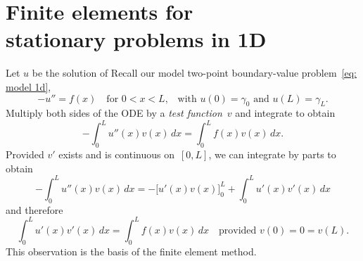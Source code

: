 \chapter[Finite elements in 1D]{Finite elements for \\
stationary problems in 1D}\label{chap: FEM 1d}

Let $u$ be the solution of 
Recall our model two-point boundary-value problem~\ref{eq: model 1d}, 
\begin{equation}\label{eq: model 1d chap 2}
-u''=f(x)\quad\text{for $0<x<L$,}
	\quad\text{with $u(0)=\gamma_0$ and $u(L)=\gamma_L$.}
\end{equation}
Multiply both sides of the ODE by a \emph{test function}~$v$ and integrate to 
obtain
\[
-\int_0^L u''(x)v(x)\,dx=\int_0^L f(x)v(x)\,dx.
\]
Provided $v'$ exists and is continuous on~$[0,L]$, we can integrate by parts to 
obtain
\begin{equation}\label{eq: int by parts}
-\int_0^L u''(x)v(x)\,dx=-\bigl[u'(x)v(x)\bigr]_0^L+\int_0^Lu'(x)v'(x)\,dx
\end{equation}
and therefore
\begin{equation}\label{eq: model 1d weak}
\int_0^L u'(x)v'(x)\,dx=\int_0^L f(x)v(x)\,dx
	\quad\text{provided $v(0)=0=v(L)$.}
\end{equation}
This observation is the basis of the finite element method.

